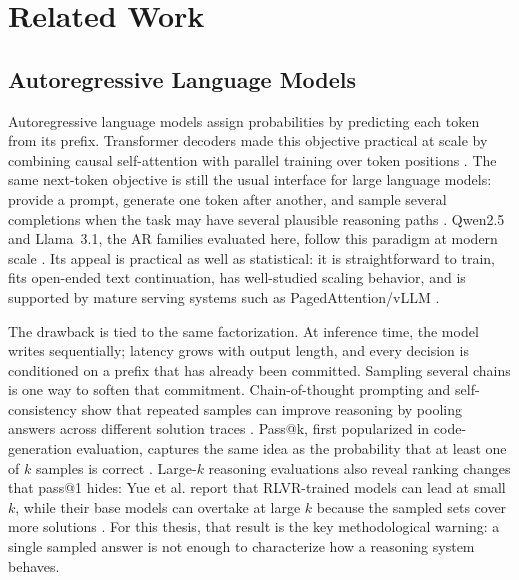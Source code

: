\section{Related Work}
\label{sec:related-work}

\subsection{Autoregressive Language Models}
Autoregressive language models assign probabilities by predicting each token
from its prefix. Transformer decoders made this objective practical at scale by
combining causal self-attention with parallel training over token positions
\cite{vaswani2017attention}. The same next-token objective is still the usual
interface for large language models: provide a prompt, generate one token after
another, and sample several completions when the task may have several plausible
reasoning paths \cite{brown2020language}. Qwen2.5 and Llama~3.1, the AR
families evaluated here, follow this paradigm at modern scale
\cite{qwen2024qwen25,grattafiori2024llama}. Its appeal is practical as well as
statistical: it is straightforward to train, fits open-ended text continuation,
has well-studied scaling behavior, and is supported by mature serving systems
such as PagedAttention/vLLM \cite{kaplan2020scaling,hoffmann2022training,kwon2023pagedattention}.

The drawback is tied to the same factorization. At inference time, the model
writes sequentially; latency grows with output length, and every decision is
conditioned on a prefix that has already been committed. Sampling several
chains is one way to soften that commitment. Chain-of-thought prompting and
self-consistency show that repeated samples can improve reasoning by pooling
answers across different solution traces \cite{wei2022chain,wang2023selfconsistency}.
Pass@k, first popularized in code-generation evaluation, captures the same
idea as the probability that at least one of $k$ samples is correct
\cite{chen2021humaneval}. Large-$k$ reasoning evaluations also reveal ranking
changes that pass@1 hides: Yue et al. report that RLVR-trained models can lead
at small $k$, while their base models can overtake at large $k$ because the
sampled sets cover more solutions \cite{yue2025rlvr}. For this thesis, that
result is the key methodological warning: a single sampled answer is not enough
to characterize how a reasoning system behaves.

